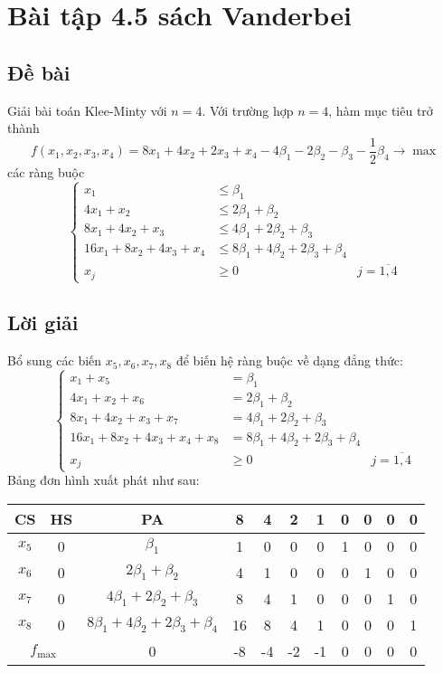 \documentclass[12pt]{article}
\begin{document}
\section{Bài tập 4.5 sách Vanderbei}\label{Vanderbei-4.5}
\subsection{Đề bài}
Giải bài toán Klee-Minty với $n = 4$. Với trường hợp $n = 4$, hàm mục tiêu trở thành
$$
f(x_1, x_2, x_3, x_4) = 8x_1 + 4x_2 + 2x_3 + x_4 - 4\beta_1 - 2\beta_2 - \beta_3 - \frac{1}{2}\beta_4 \rightarrow \max
$$
các ràng buộc
$$
\left\{
\begin{array}{lll}
x_1 &\leq \beta_1 \\
4x_1 + x_2 &\leq 2\beta_1 + \beta_2 \\
8x_1 + 4x_2 + x_3 &\leq 4\beta_1 + 2\beta_2 + \beta_3 \\
16x_1 + 8x_2 + 4x_3 + x_4 &\leq 8\beta_1 + 4\beta_2 + 2\beta_3 + \beta_4 \\
x_j &\geq 0\ &j = \overline{1, 4}
\end{array}
\right.
$$

\subsection{Lời giải}
Bổ sung các biến $x_5, x_6, x_7, x_8$ để biến hệ ràng buộc về dạng đẳng thức:
$$
\left\{
\begin{array}{lll}
x_1 + x_5 &= \beta_1 \\
4x_1 + x_2 + x_6 &= 2\beta_1 + \beta_2 \\
8x_1 + 4x_2 + x_3 + x_7 &= 4\beta_1 + 2\beta_2 + \beta_3 \\
16x_1 + 8x_2 + 4x_3 + x_4 + x_8 &= 8\beta_1 + 4\beta_2 + 2\beta_3 + \beta_4 \\
x_j &\geq 0\ &j = \overline{1, 4}
\end{array}
\right.
$$
Bảng đơn hình xuất phát như sau:
\begin{table}[H]
\centering
\begin{tabular}{|c|c|c|c|c|c|c|c|c|c|c|}
\hline
CS & HS & PA & 8 & 4 & 2 & 1 & 0 & 0 & 0 & 0 \\
\hline
$x_5$ & 0 & $\beta_1$ & 1 & 0 & 0 & 0 & 1 & 0 & 0 & 0 \\
$x_6$ & 0 & $2\beta_1 + \beta_2$ & 4 & 1 & 0 & 0 & 0 & 1 & 0 & 0 \\
$x_7$ & 0 & $4\beta_1 + 2\beta_2 + \beta_3$ & 8 & 4 & 1 & 0 & 0 & 0 & 1 & 0 \\
$x_8$ & 0 & $8\beta_1 + 4\beta_2 + 2\beta_3 + \beta_4$ & 16 & 8 & 4 & 1 & 0 & 0 & 0 & 1 \\
\hline
\multicolumn{2}{|c|}{$f_{\max}$}
& 0 & -8 & -4 & -2 & -1 & 0 & 0 & 0 & 0 \\
\hline
\end{tabular}
\end{table}
\end{document}
